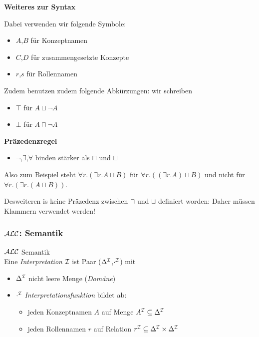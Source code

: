 \textbf{Weiteres zur Syntax}

Dabei verwenden wir folgende Symbole:

\begin{itemize}
  \item{$A$,$B$ für Konzeptnamen}
  \item{$C$,$D$ für zusammengesetzte Konzepte}
  \item{$r$,$s$ für Rollennamen}
\end{itemize}

Zudem benutzen zudem folgende Abkürzungen: wir schreiben

\begin{itemize}
  \item{$\top$ für $A \sqcup \neg A$}
  \item{$\bot$ für $A \sqcap \neg A$}
\end{itemize}

\textbf{Präzedenzregel}

\begin{itemize}
  \item{$\neg$,$\exists$,$\forall$ binden stärker als $\sqcap$ und $\sqcup$}
\end{itemize}

Also zum Beispiel steht $\forall r.(\exists r.A \sqcap B)$ für $\forall r.((\exists r.A) \sqcap B)$ und nicht für $\forall r.(\exists r.(A \sqcap B))$.

Desweiteren is keine Präzedenz zwischen $\sqcap$ und $\sqcup$ definiert worden: Daher müssen Klammern verwendet werden!

\subsubsection{$\mathcal{A}\mathcal{L}\mathcal{C}$: Semantik}

\begin{definition}{$\mathcal{A}\mathcal{L}\mathcal{C}$ Semantik} \\
Eine \emph{Interpretation} $\mathcal{I}$ ist Paar ($\Delta^{\mathcal{I}}$,$\cdot^{\mathcal{I}}$) mit
  \begin{itemize}
    \item{$\Delta^{\mathcal{I}}$ nicht leere Menge (\emph{Domäne})}
    \item{$\cdot^{\mathcal{I}}$ \emph{Interpretationsfunktion} bildet ab:
     \begin{itemize}
       \item{jeden Konzeptnamen $A$ auf Menge $A^{\mathcal{I}} \subseteq \Delta^{\mathcal{I}}$}
       \item{jeden Rollennamen $r$ auf Relation $r^{\mathcal{I}} \subseteq \Delta^{\mathcal{I}} \times \Delta^{\mathcal{I}}$}
     \end{itemize}}
  \end{itemize}
\end{definition}

